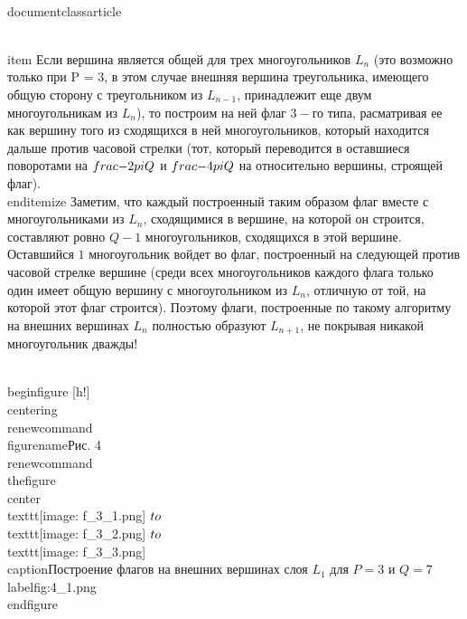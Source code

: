 \\documentclass{article}
\begin{document}
    \\item Если вершина является общей для трех многоугольников $L_{n}$ (это возможно только при P = 3, в этом случае внешняя вершина треугольника, имеющего общую сторону с треугольником из $L_{n-1}$, принадлежит еще двум многоугольникам из $L_{n}$), то построим на ней флаг $3-$го типа, расматривая ее как вершину того из сходящихся в ней многоугольников, который находится дальше против часовой стрелки (тот, который переводится в оставшиеся поворотами на $\\frac{-2\\pi}{Q}$ и $\\frac{-4\\pi}{Q}$ на  относительно вершины, строящей флаг).
\\end{itemize}
Заметим, что каждый построенный таким образом флаг вместе с многоугольниками из $L_{n}$, сходящимися в вершине, на которой он строится, составляют ровно $Q - 1$ многоугольников, сходящихся в этой вершине. Оставшийся $1$ многоугольник войдет во флаг, построенный на следующей против часовой стрелке вершине (среди всех многоугольников каждого флага только один имеет общую вершину с многоугольником из $L_{n}$, отличную от той, на которой этот флаг строится). Поэтому флаги, построенные по такому алгоритму на внешних вершинах $L_{n}$ полностью образуют $L_{n + 1}$, не покрывая никакой многоугольник дважды!

\\begin{figure} [h!]
    \\centering
    \\renewcommand{\\figurename}{Рис. 4}
    \\renewcommand{\\thefigure}{}
    \\center{\\texttt{[image: f\_3\_1.png]} $\\to$ \\texttt{[image: f\_3\_2.png]} $\\to$ \\texttt{[image: f\_3\_3.png]}}
    \\caption{Построение флагов на внешних вершинах слоя $L_{1}$ для $P = 3$ и $Q = 7$}
    \\label{fig:4_1.png}
\\end{figure}
\end{document}
